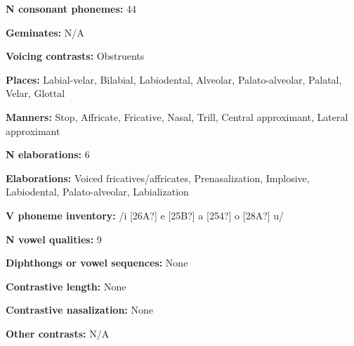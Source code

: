 \begin{styleBody}
\textbf{N consonant phonemes:} 44
\end{styleBody}

\begin{styleBody}
\textbf{Geminates:} N/A
\end{styleBody}

\begin{styleBody}
\textbf{Voicing contrasts: }Obstruents
\end{styleBody}

\begin{styleBody}
\textbf{Places: }Labial-velar, Bilabial, Labiodental, Alveolar, Palato-alveolar, Palatal, Velar, Glottal
\end{styleBody}

\begin{styleBody}
\textbf{Manners:} Stop, Affricate, Fricative, Nasal, Trill, Central approximant, Lateral approximant
\end{styleBody}

\begin{styleBody}
\textbf{N elaborations:} 6
\end{styleBody}

\begin{styleBody}
\textbf{Elaborations:} Voiced fricatives/affricates, Prenasalization, Implosive, Labiodental, Palato-alveolar, Labialization
\end{styleBody}

\begin{styleBody}
\textbf{V phoneme inventory:} /i [26A?] e [25B?] a [254?] o [28A?] u/
\end{styleBody}

\begin{styleBody}
\textbf{N vowel qualities:} 9
\end{styleBody}

\begin{styleBody}
\textbf{Diphthongs or vowel sequences:} None
\end{styleBody}

\begin{styleBody}
\textbf{Contrastive length:} None
\end{styleBody}

\begin{styleBody}
\textbf{Contrastive nasalization:} None
\end{styleBody}

\begin{styleBody}
\textbf{Other contrasts:} N/A
\end{styleBody}

